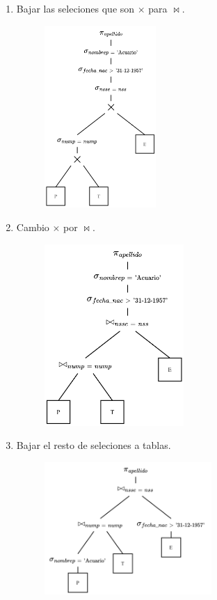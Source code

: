 \documentclass{templateNote}
\begin{document}
\begin{itemize}
\begin{enumerate}
        \item Bajar las seleciones que son $\times$ para $\Join$.
        \begin{figure}[H]
            \centering
            \includegraphics[width=0.4\textwidth]{img/E5-Paso-3.png}
        \end{figure}

        \item Cambio $\times$ por $\Join$.
        \begin{figure}[H]
            \centering
            \includegraphics[width=0.5\textwidth]{img/E5-Paso-4.png}
        \end{figure}

        \item Bajar el resto de seleciones a tablas.
        \begin{figure}[H]
            \centering
            \includegraphics[width=0.6\textwidth]{img/E5-Paso-5.png}
        \end{figure}


\end{enumerate}
\end{itemize}
\end{document}
